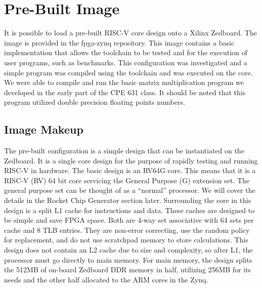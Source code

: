 \documentclass[journal]{IEEEtran}
\begin{document}
\section{Pre-Built Image}
It is possible to load a pre-built RISC-V core design onto a Xilinx Zedboard. The image is provided in the fpga-zynq repository. This image contains a basic implementation that allows the toolchain to be tested and for the execution of user programs, such as benchmarks. This configuration was investigated and a simple program was compiled using the toolchain and was executed on the core. We were able to compile and run the basic matrix multiplication program we developed in the early part of the CPE 631 class. It should be noted that this program utilized double precision floating points numbers.

\subsection{Image Makeup}
The pre-built configuration is a simple design that can be instantiated on the Zedboard. It is a single core design for the purpose of rapidly testing and running RISC-V in hardware. The basic design is an RV64G core. This means that it is a RISC-V (RV) 64 bit core servicing the General Purpose (G) extension set. The general purpose set can be thought of as a ``normal'' processor. We will cover the details in the Rocket Chip Generator section later. \newline
Surrounding the core in this design is a split L1 cache for instructions and data. These caches are designed to be simple and save FPGA space. Both are 4-way set associative with 64 sets per cache and 8 TLB entries. They are non-error correcting, use the random policy for replacement, and do not use scratchpad memory to store calculations. \newline
This design does not contain an L2 cache due to size and complexity, so after L1, the processor must go directly to main memory. For main memory, the design splits the 512MB of on-board Zedboard DDR memory in half, utilizing 256MB for its needs and the other half allocated to the ARM cores in the Zynq.
\end{document}
